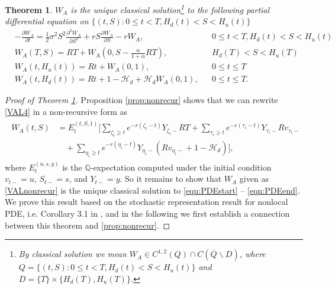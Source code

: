 \documentclass[11pt]{article}%
\numberwithin{equation}{section}
\theoremstyle{plain}
\newtheorem{theorem}{Theorem}[section]
\begin{document}
\begin{appendices}
\begin{theorem}\label{thm:main}
$W_{A}$ is the unique classical solution\footnote{By classical solution we mean $W_{A}\in C^{1,2}(Q)\cap C(\overline{Q}\backslash D)$, where $Q=\{(t,S):0\le t<T,H_{d}(t)<S<H_{u}(t)\}$ and $D=\{T\}\times\{H_{d}(T),H_{u}(T)\}$.} to the following partial differential equation on $\{(t,S):0\le t<T,H_{d}(t)<S<H_{u}(t)\}$
\begin{align}
&-\frac{\partial W_{A}}{\partial t}  =\frac{1}{2}\sigma^{2}S^{2}\frac{\partial^{2}W_{A}}{\partial S^{2}}+r S\frac{\partial W_{A}}{\partial S}-r W_{A},&&0\le t<T,H_d(t)<S<H_u(t)\\
&W_{A}(T,S)  =RT+W_{A}(0,S-\frac{\alpha}{1+\alpha}RT),&&H_d(T)<S<H_u(T)\\
&W_{A}(t,H_{u}(t))  =Rt+W_{A}(0,1),&&0\le t\le T\\
&W_{A}(t,H_d(t))  =Rt+1-\mathcal{H}_{d}+\mathcal{H}_{d}W_{A}(0,1),&&0\le t\le T.
\end{align}
\end{theorem}

\begin{proof}[Proof of Theorem \ref{thm:main}]
	Proposition \ref{prop:nonrecur} shows that we can rewrite \eqref{VAL4} in a non-recursive form as
	\begin{align*}
	\begin{split}
	W_A(t,S)&=E_t^{(t,S,1)}\Bigg[\sum_{\zeta_i\ge t}e^{-r(\zeta_i-t)}Y_{\zeta_i-}RT+\sum_{\tau_i\ge t}e^{-r(\tau_i-t)}Y_{\tau_i-}Rv_{\tau_i-}\\
	&\quad+\sum_{\eta_i\ge t}e^{-r(\eta_i-t)}Y_{\eta_i-}(Rv_{\eta_i-}+1-\mathcal{H}_d)\Bigg],
	\end{split}
	\end{align*}
	where $E^{(u,s,y)}_t$ is the $\mathbb{Q}$-expectation computed under the initial condition $v_{t-}=u$, $S_{t-}=s$, and $Y_{t-}=y$. So it remains to show that $W_A$ given as \eqref{VALnonrecur} is the unique classical solution to \eqref{eqn:PDEstart} -- \eqref{eqn:PDEend}. We prove this result based on the stochastic representation result for nonlocal PDE, i.e. Corollary 3.1 in \cite{dai_stochastic_2017}, and in the following we first establish a connection between this theorem and \eqref{prop:nonrecur}.


\end{proof}
\end{appendices}
\end{document}
